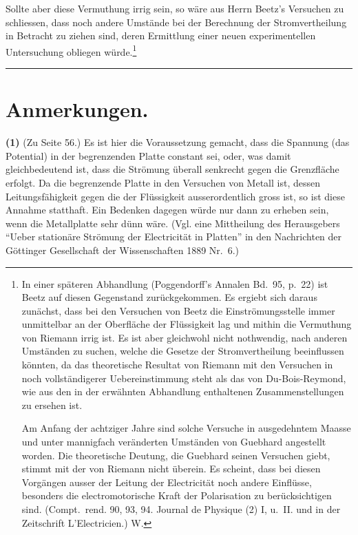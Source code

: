 \documentclass[12pt,a4paper]{article}
\begin{document}
Sollte aber diese Vermuthung irrig sein, so wäre aus Herrn Beetz's Versuchen zu schliessen, dass noch andere Umstände bei der Berechnung der Stromvertheilung in Betracht zu ziehen sind, deren Ermittlung einer neuen experimentellen Untersuchung obliegen würde.\footnote{In einer späteren Abhandlung (Poggendorff's Annalen Bd.~95, p.~22) ist Beetz auf diesen Gegenstand zurückgekommen. Es ergiebt sich daraus zunächst, dass bei den Versuchen von Beetz die Einströmungsstelle immer unmittelbar an der Oberfläche der Flüssigkeit lag und mithin die Vermuthung von Riemann irrig ist. Es ist aber gleichwohl nicht nothwendig, nach anderen Umständen zu suchen, welche die Gesetze der Stromvertheilung beeinflussen könnten, da das theoretische Resultat von Riemann mit den Versuchen in noch vollständigerer Uebereinstimmung steht als das von Du-Bois-Reymond, wie aus den in der erwähnten Abhandlung enthaltenen Zusammenstellungen zu ersehen ist.

Am Anfang der achtziger Jahre sind solche Versuche in ausgedehntem Maasse und unter mannigfach veränderten Umständen von Guebhard angestellt worden. Die theoretische Deutung, die Guebhard seinen Versuchen giebt, stimmt mit der von Riemann nicht überein. Es scheint, dass bei diesen Vorgängen ausser der Leitung der Electricität noch andere Einflüsse, besonders die electromotorische Kraft der Polarisation zu berücksichtigen sind. (Compt.~rend. 90, 93, 94. Journal de Physique (2) I, u.~II. und in der Zeitschrift L'Electricien.) W.}

\vspace{2em}
\begin{center}
\rule{0.5\textwidth}{0.4pt}
\end{center}
\vspace{1em}


\section*{Anmerkungen.}

\textbf{(1)} (Zu Seite 56.) Es ist hier die Voraussetzung gemacht, dass die Spannung (das Potential) in der begrenzenden Platte constant sei, oder, was damit gleichbedeutend ist, dass die Strömung überall senkrecht gegen die Grenzfläche erfolgt. Da die begrenzende Platte in den Versuchen von Metall ist, dessen Leitungsfähigkeit gegen die der Flüssigkeit ausserordentlich gross ist, so ist diese Annahme statthaft. Ein Bedenken dagegen würde nur dann zu erheben sein, wenn die Metallplatte sehr dünn wäre. (Vgl. eine Mittheilung des Herausgebers ``Ueber stationäre Strömung der Electricität in Platten'' in den Nachrichten der Göttinger Gesellschaft der Wissenschaften 1889 Nr.~6.)
\end{document}
